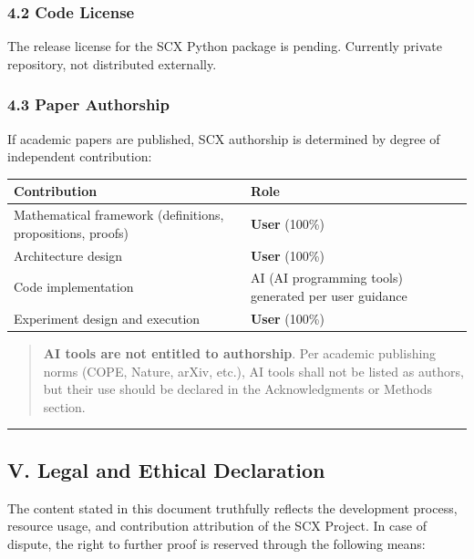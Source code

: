\documentclass[
  12pt,
]{article}
\begin{document}
\subsubsection{4.2 Code License}\label{code-license}

The release license for the SCX Python package is pending. Currently private repository, not distributed externally.

\subsubsection{4.3 Paper Authorship}\label{paper-authorship}

If academic papers are published, SCX authorship is determined by degree of independent contribution:

\begin{longtable}[]{@{}ll@{}}
\toprule\noalign{}
Contribution & Role \\
\midrule\noalign{}
\endhead
\bottomrule\noalign{}
\endlastfoot
Mathematical framework (definitions, propositions, proofs) & \textbf{User} (100\%) \\
Architecture design & \textbf{User} (100\%) \\
Code implementation & AI (AI programming tools) generated per user guidance \\
Experiment design and execution & \textbf{User} (100\%) \\
\end{longtable}

\begin{quote}
\textbf{AI tools are not entitled to authorship}. Per academic publishing norms (COPE, Nature, arXiv, etc.), AI tools shall not be listed as authors, but their use should be declared in the Acknowledgments or Methods section.
\end{quote}

\begin{center}\rule{0.5\linewidth}{0.5pt}\end{center}

\subsection{V. Legal and Ethical Declaration}\label{v-legal-and-ethical-declaration}

The content stated in this document truthfully reflects the development process, resource usage, and contribution attribution of the SCX Project. In case of dispute, the right to further proof is reserved through the following means:
\end{document}

